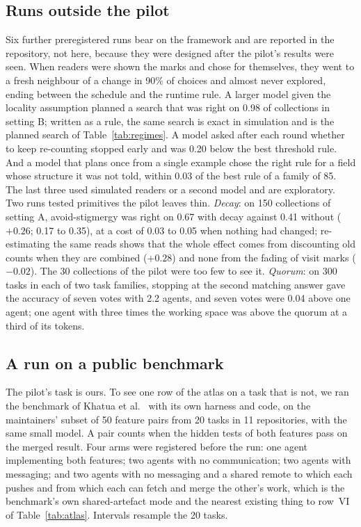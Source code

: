 \documentclass[10pt,twocolumn]{article}
\begin{document}
\subsection{Runs outside the pilot}

Six further preregistered runs bear on the framework and are reported in the repository, not here, because they were designed after the pilot's results were seen. When readers were shown the marks and chose for themselves, they went to a fresh neighbour of a change in 90\% of choices and almost never explored, ending between the schedule and the runtime rule. A larger model given the locality assumption planned a search that was right on 0.98 of collections in setting B; written as a rule, the same search is exact in simulation and is the planned search of Table~\ref{tab:regimes}. A model asked after each round whether to keep re-counting stopped early and was 0.20 below the best threshold rule. And a model that plans once from a single example chose the right rule for a field whose structure it was not told, within 0.03 of the best rule of a family of 85. The last three used simulated readers or a second model and are exploratory. Two runs tested primitives the pilot leaves thin. \emph{Decay}: on 150 collections of setting A, avoid-stigmergy was right on 0.67 with decay against 0.41 without ($+0.26$; 0.17 to 0.35), at a cost of 0.03 to 0.05 when nothing had changed; re-estimating the same reads shows that the whole effect comes from discounting old counts when they are combined ($+0.28$) and none from the fading of visit marks ($-0.02$). The 30 collections of the pilot were too few to see it. \emph{Quorum}: on 300 tasks in each of two task families, stopping at the second matching answer gave the accuracy of seven votes with 2.2 agents, and seven votes were 0.04 above one agent; one agent with three times the working space was above the quorum at a third of its tokens.

\subsection{A run on a public benchmark}\label{sec:cooperbench}

The pilot's task is ours. To see one row of the atlas on a task that is not, we ran the benchmark of Khatua et al.~\cite{khatua2026} with its own harness and code, on the maintainers' subset of 50 feature pairs from 20 tasks in 11 repositories, with the same small model. A pair counts when the hidden tests of both features pass on the merged result. Four arms were registered before the run: one agent implementing both features; two agents with no communication; two agents with messaging; and two agents with no messaging and a shared remote to which each pushes and from which each can fetch and merge the other's work, which is the benchmark's own shared-artefact mode and the nearest existing thing to row~VI of Table~\ref{tab:atlas}. Intervals resample the 20 tasks.
\end{document}
